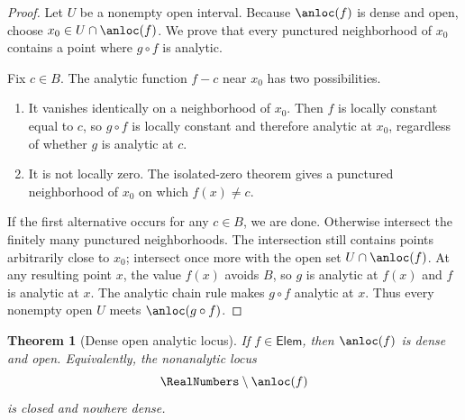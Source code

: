 \documentclass[11pt,oneside]{article}
\newtheorem{theorem}{Theorem}[section]
\theoremstyle{definition}
\theoremstyle{remark}
\begin{document}
\begin{proof}
Let $U$ be a nonempty open interval.  Because $\anloc(f)$ is dense and open, choose
$x_0\in U\cap\anloc(f)$.  We prove that every punctured neighborhood of $x_0$ contains a
point where $g\circ f$ is analytic.

Fix $c\in B$.  The analytic function $f-c$ near $x_0$ has two possibilities.
\begin{enumerate}
 \item It vanishes identically on a neighborhood of $x_0$.  Then $f$ is locally constant
 equal to $c$, so $g\circ f$ is locally constant and therefore analytic at $x_0$, regardless
 of whether $g$ is analytic at $c$.
 \item It is not locally zero.  The isolated-zero theorem gives a punctured neighborhood of
 $x_0$ on which $f(x)\ne c$.
\end{enumerate}
If the first alternative occurs for any $c\in B$, we are done.  Otherwise intersect the
finitely many punctured neighborhoods.  The intersection still contains points arbitrarily
close to $x_0$; intersect once more with the open set $U\cap\anloc(f)$.  At any resulting
point $x$, the value $f(x)$ avoids $B$, so $g$ is analytic at $f(x)$ and $f$ is analytic at
$x$.  The analytic chain rule makes $g\circ f$ analytic at $x$.  Thus every nonempty open
$U$ meets $\anloc(g\circ f)$.
\end{proof}

\begin{theorem}[Dense open analytic locus]
\label{integration:thm:elementary-dense-analytic}
If $f\in\mathsf{Elem}$, then $\anloc(f)$ is dense and open.  Equivalently, the nonanalytic
locus
\begin{equation}
 \RealNumbers\setminus\anloc(f)
 \label{integration:eq:elementary-exceptional-set}
\end{equation}
is closed and nowhere dense.
\end{theorem}
\end{document}
